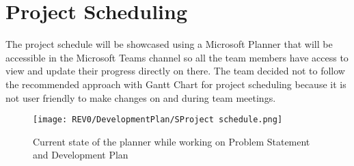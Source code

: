 \documentclass{article}
\begin{document}
\section{Project Scheduling} %
The project schedule will be showcased using a Microsoft Planner that will be accessible in the Microsoft Teams channel so all the team members have access to view and update their progress directly on there. The team decided not to follow the recommended approach with Gantt Chart for project scheduling because it is not user friendly to make changes on and during team meetings.
\begin{figure}[h]
\caption{Current state of the planner while working on Problem Statement and Development Plan}
\centering
\texttt{[image: REV0/DevelopmentPlan/SProject schedule.png]}
\end{figure}
\end{document}

